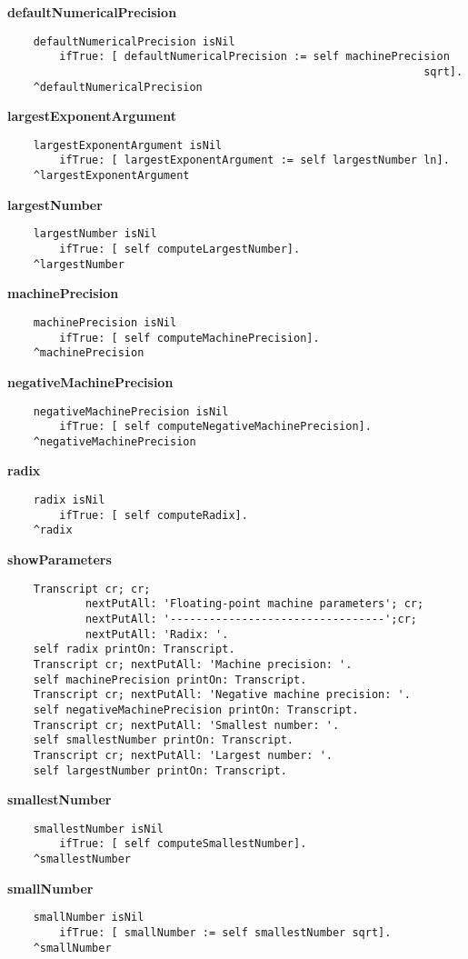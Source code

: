 {\bf defaultNumericalPrecision}
\begin{verbatim}
    defaultNumericalPrecision isNil
        ifTrue: [ defaultNumericalPrecision := self machinePrecision 
                                                                sqrt].
    ^defaultNumericalPrecision

\end{verbatim}
{\bf largestExponentArgument}
\begin{verbatim}
    largestExponentArgument isNil
        ifTrue: [ largestExponentArgument := self largestNumber ln].
    ^largestExponentArgument

\end{verbatim}
{\bf largestNumber}
\begin{verbatim}
    largestNumber isNil
        ifTrue: [ self computeLargestNumber].
    ^largestNumber

\end{verbatim}
{\bf machinePrecision}
\begin{verbatim}
    machinePrecision isNil
        ifTrue: [ self computeMachinePrecision].
    ^machinePrecision

\end{verbatim}
{\bf negativeMachinePrecision}
\begin{verbatim}
    negativeMachinePrecision isNil
        ifTrue: [ self computeNegativeMachinePrecision].
    ^negativeMachinePrecision

\end{verbatim}
{\bf radix}
\begin{verbatim}
    radix isNil
        ifTrue: [ self computeRadix].
    ^radix

\end{verbatim}
{\bf showParameters}
\begin{verbatim}
    Transcript cr; cr;
            nextPutAll: 'Floating-point machine parameters'; cr;
            nextPutAll: '---------------------------------';cr;
            nextPutAll: 'Radix: '.
    self radix printOn: Transcript.
    Transcript cr; nextPutAll: 'Machine precision: '.
    self machinePrecision printOn: Transcript.
    Transcript cr; nextPutAll: 'Negative machine precision: '.
    self negativeMachinePrecision printOn: Transcript.
    Transcript cr; nextPutAll: 'Smallest number: '.
    self smallestNumber printOn: Transcript.
    Transcript cr; nextPutAll: 'Largest number: '.
    self largestNumber printOn: Transcript.         

\end{verbatim}
{\bf smallestNumber}
\begin{verbatim}
    smallestNumber isNil
        ifTrue: [ self computeSmallestNumber].
    ^smallestNumber

\end{verbatim}
{\bf smallNumber}
\begin{verbatim}
    smallNumber isNil
        ifTrue: [ smallNumber := self smallestNumber sqrt].
    ^smallNumber

\end{verbatim}


